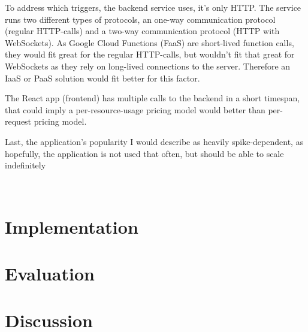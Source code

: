 \documentclass[11pt]{article}
\begin{document}
To address which triggers, the backend service uses, it's only HTTP. The service runs two different types of protocols, an one-way communication protocol (regular HTTP-calls) and a two-way communication protocol (HTTP with WebSockets). As Google Cloud Functions (FaaS) are short-lived function calls, they would fit great for the regular HTTP-calls, but wouldn't fit that great for WebSockets as they rely on long-lived connections to the server. Therefore an IaaS or PaaS solution would fit better for this factor.

The React app (frontend) has multiple calls to the backend in a short timespan, that could imply a per-resource-usage pricing model would better than per-request pricing model.

Last, the application's popularity I would describe as heavily spike-dependent, as hopefully, the application is not used that often, but should be able to scale indefinitely 

\

\section{Implementation}


\section{Evaluation}


\section{Discussion}
\end{document}
